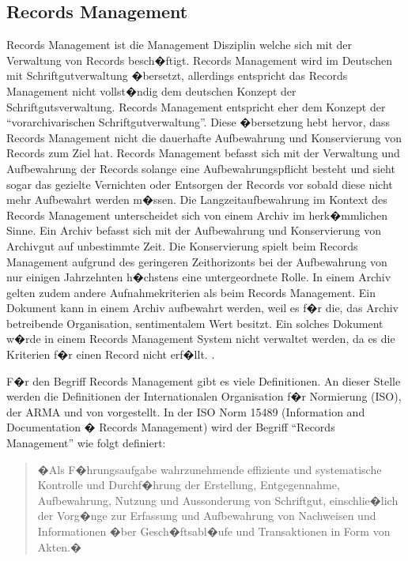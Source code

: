 \documentclass[a4paper,twoside,10pt]{report}
\begin{document}
\subsection{Records Management}\label{subsec:defrm}
Records Management ist die Management Disziplin welche sich mit der Verwaltung von Records besch�ftigt. Records Management wird im Deutschen mit Schriftgutverwaltung �bersetzt, allerdings entspricht das Records Management nicht vollst�ndig dem deutschen Konzept der Schriftgutsverwaltung. Records Management entspricht eher dem Konzept der "`vorarchivarischen Schriftgutverwaltung"'. Diese �bersetzung hebt hervor, dass Records Management nicht die dauerhafte Aufbewahrung und Konservierung von Records zum Ziel hat. Records Management befasst sich mit der Verwaltung und Aufbewahrung der Records solange eine Aufbewahrungspflicht besteht und sieht sogar das gezielte Vernichten oder Entsorgen der Records vor sobald diese nicht mehr Aufbewahrt werden m�ssen. Die Langzeitaufbewahrung im Kontext des Records Management unterscheidet sich von einem Archiv im herk�mmlichen Sinne. Ein Archiv befasst sich mit der Aufbewahrung und Konservierung von Archivgut auf unbestimmte Zeit. Die Konservierung spielt beim Records Management aufgrund des geringeren Zeithorizonts bei der Aufbewahrung von nur einigen Jahrzehnten h�chstens eine untergeordnete Rolle. In einem Archiv gelten zudem andere Aufnahmekriterien als beim Records Management. Ein Dokument kann in einem Archiv aufbewahrt werden, weil es f�r die, das Archiv betreibende Organisation, sentimentalem Wert besitzt. Ein solches Dokument w�rde in einem Records Management System nicht verwaltet werden, da es die Kriterien f�r einen Record nicht erf�llt.  \cite{rmprinzipien}.

F�r den Begriff Records Management gibt es viele Definitionen. An dieser Stelle werden die Definitionen der Internationalen Organisation f�r Normierung (ISO),  der \ac{ARMA} und von \citeauthor{rmHandbook} vorgestellt. In der ISO Norm 15489 (Information and Documentation � Records Management) wird der Begriff "`Records Management"' wie folgt definiert:

\begin{quotation}
	�Als  F�hrungsaufgabe  wahrzunehmende  effiziente  und  systematische  Kontrolle 
und Durchf�hrung der Erstellung, Entgegennahme, Aufbewahrung, Nutzung und 
Aussonderung  von  Schriftgut,  einschlie�lich  der  Vorg�nge  zur  Erfassung  und 
Aufbewahrung  von  Nachweisen  und  Informationen  �ber  Gesch�ftsabl�ufe  und 
Transaktionen in Form von Akten.�\cite{ISO15489}
\end{quotation}
\end{document}
